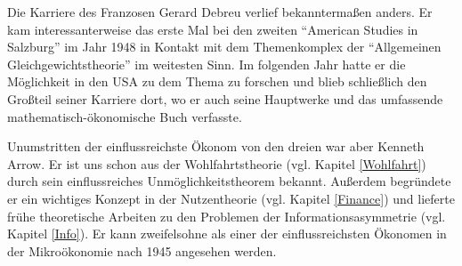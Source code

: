 Die Karriere des Franzosen Gerard Debreu verlief bekanntermaßen anders. Er kam interessanterweise das erste Mal bei den zweiten "`American Studies in Salzburg"' im Jahr 1948 in Kontakt mit dem Themenkomplex der "`Allgemeinen Gleichgewichtstheorie"' im weitesten Sinn. Im folgenden Jahr hatte er die Möglichkeit in den USA zu dem Thema zu forschen und blieb schließlich den Großteil seiner Karriere dort, wo er auch seine Hauptwerke \textcite{Arrow1954} und das umfassende mathematisch-ökonomische Buch \textcite{Debreu1959} verfasste.

Unumstritten der einflussreichste Ökonom von den dreien war aber Kenneth Arrow. Er ist uns schon aus der Wohlfahrtstheorie (vgl. Kapitel \ref{Wohlfahrt}) durch sein einflussreiches Unmöglichkeitstheorem bekannt. Außerdem begründete er ein wichtiges Konzept in der Nutzentheorie (vgl. Kapitel \ref{Finance}) und lieferte frühe theoretische Arbeiten zu den Problemen der Informationsasymmetrie (vgl. Kapitel \ref{Info}). Er kann zweifelsohne als einer der einflussreichsten Ökonomen in der Mikroökonomie nach 1945 angesehen werden. 

